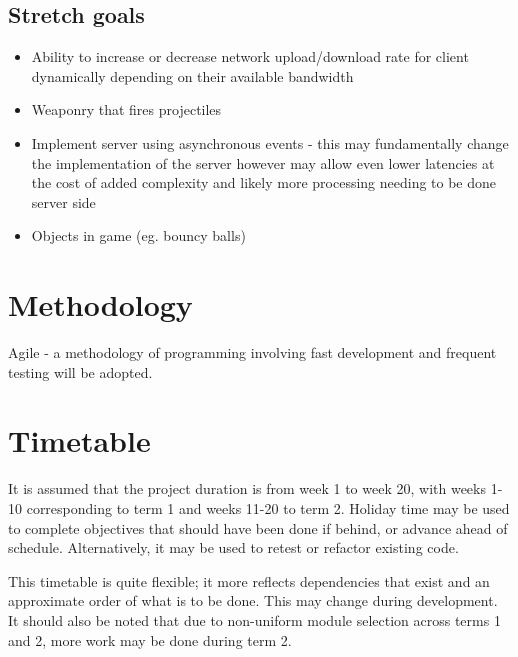 \documentclass{article}
\begin{document}
\subsection*{Stretch goals}
	
	\begin{itemize}
		\item Ability to increase or decrease network upload/download rate for client dynamically depending on their available bandwidth
		\item Weaponry that fires projectiles
		\item Implement server using asynchronous events - this may fundamentally change the implementation of the server however may allow even lower latencies at the cost of added complexity and likely more processing needing to be done server side
		\item Objects in game (eg. bouncy balls)

	\end{itemize}

\section{Methodology}
	
	Agile - a methodology of programming involving fast development and frequent testing will be adopted.

\section{Timetable}
	
	It is assumed that the project duration is from week 1 to week 20, with weeks 1-10 corresponding to term 1 and weeks 11-20 to term 2. Holiday time may be used to complete objectives that should have been done if behind, or advance ahead of schedule. Alternatively, it may be used to retest or refactor existing code.

	This timetable is quite flexible; it more reflects dependencies that exist and an approximate order of what is to be done. This may change during development. It should also be noted that due to non-uniform module selection across terms 1 and 2, more work may be done during term 2.\\
\end{document}

